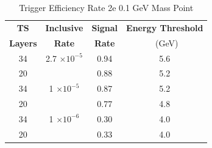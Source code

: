\begin{table}
 \centering
\caption{Trigger Efficiency Rate 2e 0.1 GeV Mass Point}
\begin{tabular}{ c | c | c | c }
\textbf{TS} & \textbf{Inclusive} & \textbf{Signal} & \textbf{Energy Threshold}  \\ \textbf{Layers} & \textbf{Rate} & \textbf{Rate} & \ (GeV) \\ 
\hline
34 & 2.7 $\times 10^{-5}$ & 0.94 & 5.6 \\ 
20 & & 0.88 & 5.2 \\ 
\hline 
34 & 1 $\times 10^{-5}$ & 0.87 & 5.2 \\ 
20 & & 0.77 & 4.8 \\ 
\hline 
34 & 1 $\times 10^{-6}$ & 0.30 & 4.0 \\ 
20 & & 0.33 & 4.0 \\ 
\hline 
\end{tabular}
\end{table}
